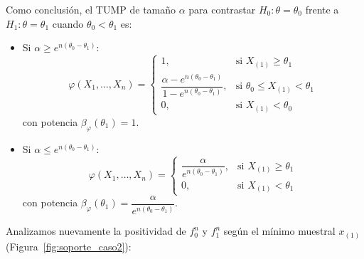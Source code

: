 \begin{ejercicio}
\begin{description}
    Como conclusión, el TUMP de tamaño $\alpha$ para contrastar $H_0: \theta = \theta_0$ frente a $H_1: \theta = \theta_1$ cuando $\theta_0 < \theta_1$ es:
    \begin{itemize}
        \item Si $\alpha \ge e^{n(\theta_0 - \theta_1)}$:
        \begin{equation*}
            \varphi(X_1, \dots, X_n) =
            \begin{cases}
                1, & \text{si } X_{(1)} \ge \theta_1 \\
                \dfrac{\alpha - e^{n(\theta_0 - \theta_1)}}{1 - e^{n(\theta_0 - \theta_1)}}, & \text{si } \theta_0 \le X_{(1)} < \theta_1 \\
                0, & \text{si } X_{(1)} < \theta_0
            \end{cases}
        \end{equation*}
        con potencia $\beta_\varphi(\theta_1) = 1$.
        \item Si $\alpha \le e^{n(\theta_0 - \theta_1)}$:
        \begin{equation*}
            \varphi(X_1, \dots, X_n) =
            \begin{cases}
                \dfrac{\alpha}{e^{n(\theta_0 - \theta_1)}}, & \text{si } X_{(1)} \ge \theta_1 \\
                0, & \text{si } X_{(1)} < \theta_1
            \end{cases}
        \end{equation*}
        con potencia $\beta_\varphi(\theta_1) = \dfrac{\alpha}{e^{n(\theta_0 - \theta_1)}}$.
    \end{itemize}

    \item[Caso $\theta_1 < \theta_0$:]

    Analizamos nuevamente la positividad de $f_0^n$ y $f_1^n$ según el mínimo muestral $x_{(1)}$ (Figura~\ref{fig:soporte_caso2}):
    \begin{figure}[ht]
        \centering
\end{figure}
\end{description}
\end{ejercicio}

